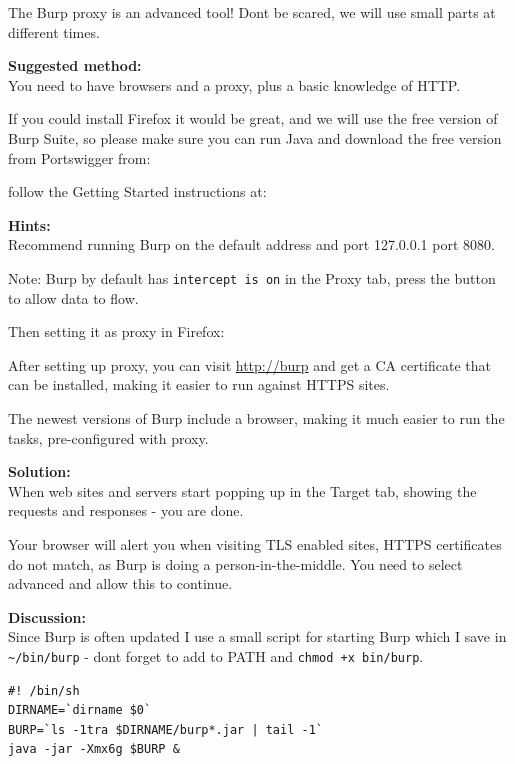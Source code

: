 \documentclass[a4paper,11pt,notitlepage]{report}
\begin{document}
The Burp proxy is an advanced tool! Dont be scared, we will use small parts at different times.

{\bf Suggested method:}\\
You need to have browsers and a proxy, plus a basic knowledge of HTTP.

If you could install Firefox it would be great, and we will use the
free version of Burp Suite, so please make sure you can run Java and
download the free version from Portswigger from:



follow the Getting Started instructions at:\\


{\bf Hints:}\\
Recommend running Burp on the default address and port 127.0.0.1 port 8080.

Note: Burp by default has \verb+intercept is on+ in the Proxy tab, press the button to allow data to flow.


\eject
Then setting it as proxy in Firefox:


After setting up proxy, you can visit \url{http://burp} and get a CA certificate that can be installed, making it easier to run against HTTPS sites.

The newest versions of Burp include a browser, making it much easier to run the tasks, pre-configured with proxy.

{\bf Solution:}\\
When web sites and servers start popping up in the Target tab, showing the requests and responses - you are done.

Your browser will alert you when visiting TLS enabled sites, HTTPS certificates do not match, as Burp is doing a person-in-the-middle. You need to select advanced and allow this to continue.

{\bf Discussion:}\\
Since Burp is often updated I use a small script for starting Burp which I save in \verb+~/bin/burp+ - dont forget to add to PATH and \verb;chmod +x bin/burp;.

\begin{verbatim}
#! /bin/sh
DIRNAME=`dirname $0`
BURP=`ls -1tra $DIRNAME/burp*.jar | tail -1`
java -jar -Xmx6g $BURP &
\end{verbatim}
\end{document}
